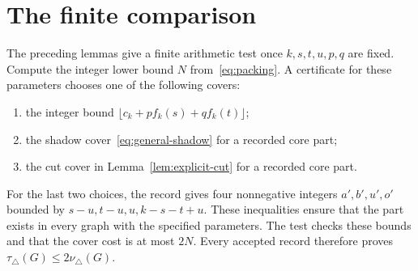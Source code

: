 \documentclass[11pt]{article}
\newcommand{\tp}{\nu_{\triangle}}
\newcommand{\tc}{\tau_{\triangle}}
\begin{document}
\section{The finite comparison}\label{sec:finite}
The preceding lemmas give a finite arithmetic test once $k,s,t,u,p,q$
are fixed. Compute the integer lower bound $N$ from~\eqref{eq:packing}.
A certificate for these parameters chooses one of the following covers:
\begin{enumerate}
\item the integer bound $\lfloor c_k+p f_k(s)+q f_k(t)\rfloor$;
\item the shadow cover~\eqref{eq:general-shadow} for a recorded core part;
\item the cut cover in Lemma~\ref{lem:explicit-cut} for a recorded core part.
\end{enumerate}
For the last two choices, the record gives four nonnegative integers
$a',b',u',o'$ bounded by $s-u,t-u,u,k-s-t+u$. These inequalities ensure
that the part exists in every graph with the specified parameters.
The test checks these bounds and that the cover cost is at most $2N$.
Every accepted record therefore proves $\tc(G)\leq2\tp(G)$.
\end{document}
